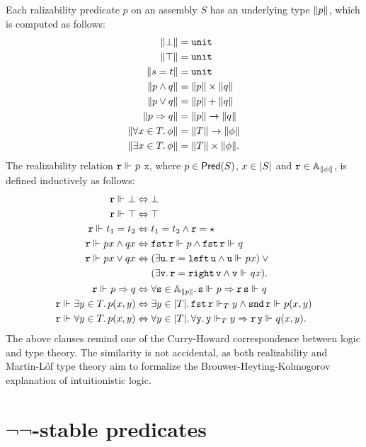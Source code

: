 Each ralizability predicate $p$ on an assembly $S$ has an underlying type $\T{p}$, which is computed as follows:
%
\begin{align*}
  \T{\bot} &= \unit \\
  \T{\top} &= \unit \\
  \T{s = t} &= \unit \\
  \T{p \land q} &= \T{p} \times \T{q}\\
  \T{p \lor q} &= \T{p} + \T{q}\\
  \T{p \lthen q} &= \T{p} \to \T{q}\\
  \T{\all{x \in T}{\phi}} &= \T{T} \to \T{\phi} \\
  \T{\some{x \in T}{\phi}} &= \T{T} \times \T{\phi}.
\end{align*}
%
The realizability relation $\R{r} \rz p$ x, where $p \in \Pred{S}$, $x \in \S{S}$ and $\R{r} \in \Atyp{\T{\phi}}$, is defined inductively as follows:
%
\begin{align*}
  \R{r} \rz \bot &\liff \bot\\
  \R{r} \rz \top &\liff \top\\
  \R{r} \rz t_1 = t_2 &\liff t_1 = t_2 \land \R{r} = \star\\
  \R{r} \rz p x \land q x &\liff
  \combFst\,\R{r} \rz p \land \combFst\,\R{r} \rz q\\
  \R{r} \rz p x \lor q x
    &\liff
    \begin{aligned}[t]
      & (\some{\R{u}} \R{r} = \combLeft\,\R{u} \land \R{u} \rz p x)
      \lor {} \\
      &(\some{\R{v}} \R{r} = \combRight\,\R{v} \land \R{v} \rz q x).
    \end{aligned}
  \\
  \R{r} \rz p \lthen q &\liff
  \all{\R{s} \in \Atyp{\T{p}}} \R{s} \rz p \lthen \R{r}\,\R{s} \rz q
  \\
  \R{r} \rz \some{y \in T} p(x,y) &\liff
  \some{y \in \S{T}} \combFst\,\R{r} \rz[T] y \land \combSnd\,\R{r} \rz p(x,y)
  \\
  \R{r} \rz \all{y \in T} p(x, y) &\liff
    \all{y \in \S{T}} \all{\R{y}}
     \R{y} \rz[T] y \lthen \R{r}\,\R{y} \rz q(x,y).
\end{align*}
%
The above clauses remind one of the Curry-Howard correspondence between logic and type theory. The similarity is not accidental, as both realizability and Martin-Löf type theory aim to formalize the Brouwer-Heyting-Kolmogorov explanation of intuitionistic logic.

\section[\texorpdfstring{$\neg\neg$-stable predicates}{Not-not-stable predicates}]{$\neg\neg$-stable predicates}
\label{sec:decidable-predicates}

